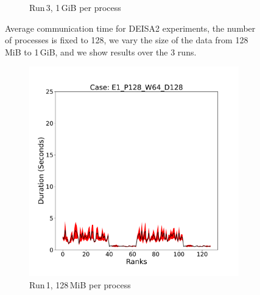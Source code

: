 \begin{figure}
\begin{subfigure}[b]{0.3\textwidth}
         \caption{Run\,3, 1\,GiB per process}
         \label{fig:E3_1_d2}
     \end{subfigure}
        \caption{Average communication time for DEISA2 experiments, the number of processes is fixed to 128, we vary the size of the data from 128\,MiB to 1\,GiB, and we show results over the 3 runs.}
        \label{fig:variability2}
\end{figure}


\begin{figure}
     \centering
     \begin{subfigure}[b]{0.3\textwidth}
         \centering
         \includegraphics[width=\textwidth, height=\textwidth]{figures/deisa1__E1_P128_W64_D128.pdf}
         \caption{Run\,1, 128\,MiB per process}
         \label{fig:E1_128_d11}
     \end{subfigure}
     \hfill
     \begin{subfigure}[b]{0.3\textwidth}
         \centering

\end{subfigure}
\end{figure}
